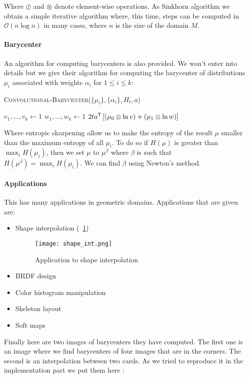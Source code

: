 Where $\oslash$ and $\otimes$ denote element-wise operations. As Sinkhorn algorithm we obtain a simple iterative algorithm where, this time, steps can be computed in $\mathcal{O}(n \log n)$ in many cases, where $n$ is the size of the domain $M$.

\paragraph{Barycenter}
An algorithm for computing barycenters is also provided. We won't enter into details but we give their algorithm for computing the barycenter of distributions $\mu_i$ associated with weights $\alpha_i$ for $1 \leqslant i \leqslant k$:

\vspace{3mm}
\begin{algorithm}[H]
	\caption{\textsc{Convolutional-Barycenter}($\{\mu_i\}, \{ \alpha_i \}, H_t, a$)}
	$v_1, \dots, v_k \gets 1$ \;
	$w_1, \dots, w_k \gets 1$ \;
	\Return $2t a^{\mathsf{T}} \left[ \left( \mu_0 \otimes \ln v \right) + \left( \mu_1 \otimes \ln w \right) \right]$
\end{algorithm}
\vspace{3mm}
Where entropic sharpening allow us to make the entropy of the result $\mu$ smaller than the maximum entropy of all $\mu_i$. To do so if $H(\mu)$ is greater than $\max_i H(\mu_i)$, then we set $\mu$ to $\mu^\beta$ where $\beta$ is such that $H(\mu^\beta) = \max_i H(\mu_i)$. We can find $\beta$ using Newton's method.

\paragraph{Applications}
This has many applications in geometric domains. Applications that are given are:
\begin{itemize}
	\item Shape interpolation (\figurename~\ref{shape})
		\begin{figure}[h]
			\centering
			\texttt{[image: shape\_int.png]}
			\caption{Application to shape interpolation}
			\label{shape}
		\end{figure}
	\item BRDF design
	\item Color histogram manipulation
	\item Skeleton layout
	\item Soft maps
\end{itemize}
Finally here are two images of barycenters they have computed. The first one is an image where we find barycenters of four images that are in the corners. The second is an interpolation between two cards. As we tried to reproduce it in the implementation part we put them here :

